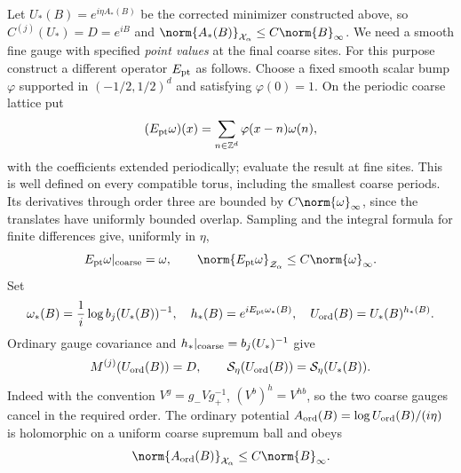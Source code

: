 Let $U_*(B)=e^{i\eta A_*(B)}$ be the corrected minimizer
constructed above, so $C^{(j)}(U_*)=D=e^{iB}$ and
$\norm{A_*(B)}_{\mathcal X_\alpha}\le C\norm{B}_\infty$.
We need a smooth fine gauge with specified \emph{point values}
at the final coarse sites. For this purpose construct a
different operator $E_{\rm pt}$ as follows. Choose a fixed
smooth scalar bump $\varphi$ supported in
$(-1/2,1/2)^d$ and satisfying $\varphi(0)=1$. On the
periodic coarse lattice put
\begin{equation}\label{ot-point-extension}
 (E_{\rm pt}\omega)(x)=\sum_{n\in\mathbb Z^d}
                  \varphi(x-n)\omega(n),
\end{equation}
with the coefficients extended periodically; evaluate the
result at fine sites. This is well defined on every
compatible torus, including the smallest coarse periods.
Its derivatives through order three are bounded by
$C\norm{\omega}_\infty$, since the translates have uniformly
bounded overlap. Sampling and the integral formula for
finite differences give, uniformly in $\eta$,
\begin{equation}\label{ot-point-bounds}
 E_{\rm pt}\omega|_{\rm coarse}=\omega,\qquad
 \norm{E_{\rm pt}\omega}_{\mathcal Z_\alpha}
                          \le C\norm{\omega}_\infty.
\end{equation}
Set
\begin{equation}\label{ot-ordinary-representative}
 \omega_*(B)=\frac1i\log b_j(U_*(B))^{-1},\quad
 h_*(B)=e^{iE_{\rm pt}\omega_*(B)},\quad
 U_{\rm ord}(B)=U_*(B)^{h_*(B)}.
\end{equation}
Ordinary gauge covariance and $h_*|_{\rm coarse}=b_j(U_*)^{-1}$
give
\begin{equation}\label{ot-ordinary-exact}
 M^{(j)}(U_{\rm ord}(B))=D,\qquad
 \mathcal S_\eta(U_{\rm ord}(B))=\mathcal S_\eta(U_*(B)).
\end{equation}
Indeed with the convention $V^g=g_-Vg_+^{-1}$,
$(V^b)^h=V^{hb}$, so the two coarse gauges cancel in the
required order. The ordinary potential
$A_{\rm ord}(B)=\log U_{\rm ord}(B)/(i\eta)$ is holomorphic
on a uniform coarse supremum ball and obeys
\begin{equation}\label{ot-ordinary-bound}
 \norm{A_{\rm ord}(B)}_{\mathcal X_\alpha}
                              \le C\norm{B}_\infty.
\end{equation}

